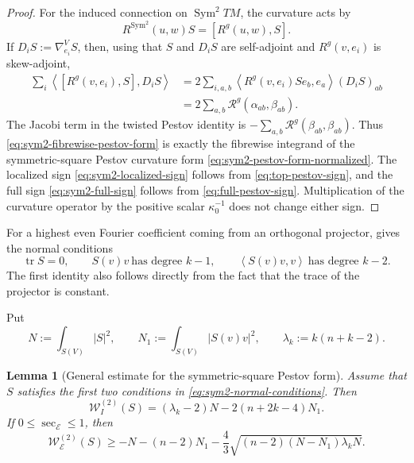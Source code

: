 \documentclass[reqno,11pt]{amsart}
\newtheorem{lemma}[theorem]{Lemma}
\theoremstyle{definition}
\newcommand{\Rop}{\mathscr R}
\newcommand{\cE}{\mathcal E}
\newcommand{\Sym}{\operatorname{Sym}}
\newcommand{\tr}{\operatorname{tr}}
\newcommand{\inner}[2]{\left\langle #1,#2\right\rangle}
\begin{document}
\begin{proof}
For the induced connection on $\Sym^2TM$, the curvature acts by
$$
  R^{\Sym^2}(u,w)S=[R^g(u,w),S].
$$
If $D_iS:=\nabla^V_{e_i}S$, then, using that $S$ and $D_iS$ are
self-adjoint and $R^g(v,e_i)$ is skew-adjoint,
\begin{align*}
 \sum_i\inner{[R^g(v,e_i),S]}{D_iS}
 &=2\sum_{i,a,b}
   \inner{R^g(v,e_i)S e_b}{e_a}(D_iS)_{ab} \\
 &=2\sum_{a,b}\Rop^g(\alpha_{ab},\beta_{ab}).
\end{align*}
The Jacobi term in the twisted Pestov identity is
$-\sum_{a,b}\Rop^g(\beta_{ab},\beta_{ab})$.  Thus
\eqref{eq:sym2-fibrewise-pestov-form} is exactly the fibrewise integrand of the symmetric-square Pestov curvature form
\eqref{eq:sym2-pestov-form-normalized}.  The localized sign
\eqref{eq:sym2-localized-sign} follows from \eqref{eq:top-pestov-sign}, and the
full sign \eqref{eq:sym2-full-sign} follows from \eqref{eq:full-pestov-sign}.
Multiplication of the curvature operator by the positive scalar
$\kappa_0^{-1}$ does not change either sign.
\end{proof}

For a highest even Fourier coefficient coming from an orthogonal projector,
\cite[Lemma~4.2]{CLMS24} gives the normal conditions
\begin{equation}\label{eq:sym2-normal-conditions}
  \tr S=0,
  \qquad
  S(v)v\ \text{has degree }k-1,
  \qquad
  \inner{S(v)v}{v}\ \text{has degree }k-2.
\end{equation}
The first identity also follows directly from the fact that the trace of the
projector is constant.

Put
\begin{equation*}
  N:=\int_{S(V)}|S|^2,
  \qquad
  N_1:=\int_{S(V)}|S(v)v|^2,
  \qquad
  \lambda_k:=k(n+k-2).
\end{equation*}

\begin{lemma}[General estimate for the symmetric-square Pestov form]
\label{lem:sym2-general-estimate}
Assume that $S$ satisfies the first two conditions in
\eqref{eq:sym2-normal-conditions}. Then
\begin{equation}\label{eq:sym2-WI}
  \mathscr W^{(2)}_I(S)
  =(\lambda_k-2)N-2(n+2k-4)N_1.
\end{equation}
If $0\leq\sec_{\cE}\leq1$, then
\begin{equation}\label{eq:sym2-residual}
 \mathscr W^{(2)}_{\cE}(S)
 \geq
 -N-(n-2)N_1
 -\frac43\sqrt{(n-2)(N-N_1)\lambda_kN}.
\end{equation}
\end{lemma}
\end{document}
